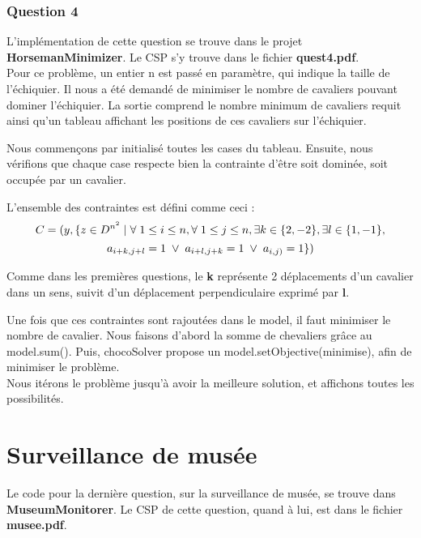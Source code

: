 \documentclass{article}
\begin{document}
\subsubsection{Question 4}
L'implémentation de cette question se trouve dans le projet \textbf{HorsemanMinimizer}. Le CSP s'y trouve dans le fichier \textbf{quest4.pdf}. \\

Pour ce problème, un entier n est passé en paramètre, qui indique la taille de l'échiquier. Il nous a été demandé de minimiser le nombre de cavaliers pouvant dominer l'échiquier. La sortie comprend le nombre minimum de cavaliers requit ainsi qu'un tableau affichant les positions de ces cavaliers sur l'échiquier.

Nous commençons par initialisé toutes les cases du tableau. Ensuite, nous vérifions que chaque case respecte bien la contrainte d'être soit dominée, soit occupée par un cavalier. 

L'ensemble des contraintes est défini comme ceci :  
  $$ C = (y, \{z \in D^{n^2} \hspace{0.1cm} | \hspace{0.1cm} \forall \hspace{0.1cm} 1 \leq i \leq n, \forall \hspace{0.1cm} 1 \leq j \leq n, \exists k \in \{2,-2\}, \exists l \in \{1,-1\},$$
 $$ a_{i+k,j+l}=1 \hspace{0.1cm} \vee \hspace{0.1cm} a_{i+l,j+k}=1 \hspace{0.1cm} \vee \hspace{0.1cm} a_{i,j)} = 1\}) $$ 
 
 Comme dans les premières questions, le \textbf{k} représente 2 déplacements d'un cavalier dans un sens, suivit d'un déplacement perpendiculaire exprimé par \textbf{l}. 
 
 Une fois que ces contraintes sont rajoutées dans le model, il faut minimiser le nombre de cavalier. Nous faisons d'abord la somme de chevaliers grâce au model.sum(). Puis, chocoSolver propose un model.setObjective(minimise), afin de minimiser le problème.\\
 
 Nous itérons le problème jusqu'à avoir la meilleure solution, et affichons toutes les possibilités.					
 
\section{Surveillance de musée}
Le code pour la dernière question, sur la surveillance de musée, se trouve dans \textbf{MuseumMonitorer}. Le CSP de cette question, quand à lui, est dans le fichier \textbf{musee.pdf}.\\
\end{document}
